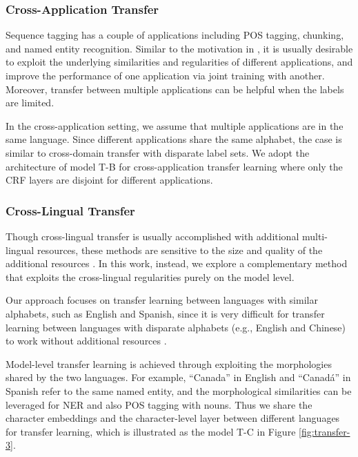 \subsubsection{Cross-Application Transfer}

Sequence tagging has a couple of applications including POS tagging, chunking, and named entity recognition. Similar to the motivation in \citep{collobert2011natural}, it is usually desirable to exploit the underlying similarities and regularities of different applications, and improve the performance of one application via joint training with another. Moreover, transfer between multiple applications can be helpful when the labels are limited.

In the cross-application setting, we assume that multiple applications are in the same language. Since different applications share the same alphabet, the case is similar to cross-domain transfer with disparate label sets. We adopt the architecture of model T-B for cross-application transfer learning where only the CRF layers are disjoint for different applications.

\subsubsection{Cross-Lingual Transfer}

Though cross-lingual transfer is usually accomplished with additional multi-lingual resources, these methods are sensitive to the size and quality of the additional resources \citep{yarowsky2001inducing,wang2013cross}. In this work, instead, we explore a complementary method that exploits the cross-lingual regularities purely on the model level.

Our approach focuses on transfer learning between languages with similar alphabets, such as English and Spanish, since it is very difficult for transfer learning between languages with disparate alphabets (e.g., English and Chinese) to work without additional resources \citep{zirikly2cross}.

Model-level transfer learning is achieved through exploiting the morphologies shared by the two languages. For example, ``Canada'' in English and ``Canad\'{a}'' in Spanish refer to the same named entity, and the morphological similarities can be leveraged for NER and also POS tagging with nouns. Thus we share the character embeddings and the character-level layer between different languages for transfer learning, which is illustrated as the model T-C in Figure \ref{fig:transfer-3}.

